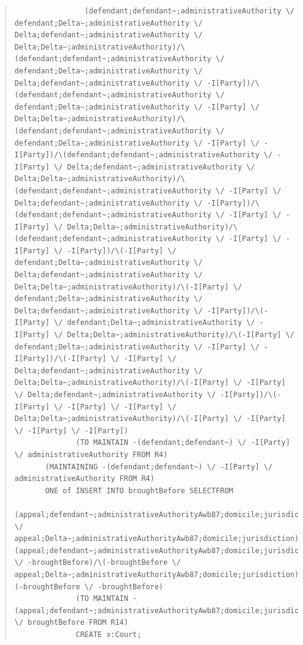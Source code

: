 \documentclass[10pt,a4paper]{report}              %
\theoremstyle{plain}\theorembodyfont{\rmfamily}\newtheorem{definition}{Definition}[section]
\theoremstyle{plain}\theorembodyfont{\rmfamily}\newtheorem{designrule}[definition]{Requirement}
\begin{document}
\begin{quote}
\begin{verbatim}
                (defendant;defendant~;administrativeAuthority \/ defendant;Delta~;administrativeAuthority \/ Delta;defendant~;administrativeAuthority \/ Delta;Delta~;administrativeAuthority)/\(defendant;defendant~;administrativeAuthority \/ defendant;Delta~;administrativeAuthority \/ Delta;defendant~;administrativeAuthority \/ -I[Party])/\(defendant;defendant~;administrativeAuthority \/ defendant;Delta~;administrativeAuthority \/ -I[Party] \/ Delta;Delta~;administrativeAuthority)/\(defendant;defendant~;administrativeAuthority \/ defendant;Delta~;administrativeAuthority \/ -I[Party] \/ -I[Party])/\(defendant;defendant~;administrativeAuthority \/ -I[Party] \/ Delta;defendant~;administrativeAuthority \/ Delta;Delta~;administrativeAuthority)/\(defendant;defendant~;administrativeAuthority \/ -I[Party] \/ Delta;defendant~;administrativeAuthority \/ -I[Party])/\(defendant;defendant~;administrativeAuthority \/ -I[Party] \/ -I[Party] \/ Delta;Delta~;administrativeAuthority)/\(defendant;defendant~;administrativeAuthority \/ -I[Party] \/ -I[Party] \/ -I[Party])/\(-I[Party] \/ defendant;Delta~;administrativeAuthority \/ Delta;defendant~;administrativeAuthority \/ Delta;Delta~;administrativeAuthority)/\(-I[Party] \/ defendant;Delta~;administrativeAuthority \/ Delta;defendant~;administrativeAuthority \/ -I[Party])/\(-I[Party] \/ defendant;Delta~;administrativeAuthority \/ -I[Party] \/ Delta;Delta~;administrativeAuthority)/\(-I[Party] \/ defendant;Delta~;administrativeAuthority \/ -I[Party] \/ -I[Party])/\(-I[Party] \/ -I[Party] \/ Delta;defendant~;administrativeAuthority \/ Delta;Delta~;administrativeAuthority)/\(-I[Party] \/ -I[Party] \/ Delta;defendant~;administrativeAuthority \/ -I[Party])/\(-I[Party] \/ -I[Party] \/ -I[Party] \/ Delta;Delta~;administrativeAuthority)/\(-I[Party] \/ -I[Party] \/ -I[Party] \/ -I[Party])
              (TO MAINTAIN -(defendant;defendant~) \/ -I[Party] \/ administrativeAuthority FROM R4)
       (MAINTAINING -(defendant;defendant~) \/ -I[Party] \/ administrativeAuthority FROM R4)
       ONE of INSERT INTO broughtBefore SELECTFROM
                (appeal;defendant~;administrativeAuthorityAwb87;domicile;jurisdiction \/ appeal;Delta~;administrativeAuthorityAwb87;domicile;jurisdiction)/\(appeal;defendant~;administrativeAuthorityAwb87;domicile;jurisdiction \/ -broughtBefore)/\(-broughtBefore \/ appeal;Delta~;administrativeAuthorityAwb87;domicile;jurisdiction)/\(-broughtBefore \/ -broughtBefore)
              (TO MAINTAIN -(appeal;defendant~;administrativeAuthorityAwb87;domicile;jurisdiction) \/ broughtBefore FROM R14)
              CREATE x:Court;

\end{verbatim}
\end{quote}
\end{document}
